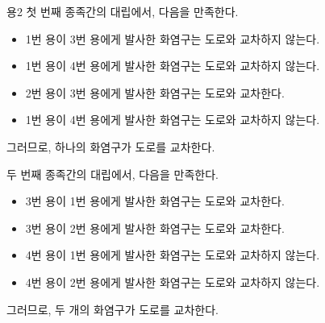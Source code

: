 \begin{problem}{용2}
	첫 번째 종족간의 대립에서, 다음을 만족한다.
	
	\begin{itemize}
		\item 1번 용이 3번 용에게 발사한 화염구는 도로와 교차하지 않는다.
		\item 1번 용이 4번 용에게 발사한 화염구는 도로와 교차하지 않는다.
		\item 2번 용이 3번 용에게 발사한 화염구는 도로와 교차한다.
		\item 1번 용이 4번 용에게 발사한 화염구는 도로와 교차하지 않는다.
	\end{itemize}

	그러므로, 하나의 화염구가 도로를 교차한다.
	
	두 번째 종족간의 대립에서, 다음을 만족한다.
	
	\begin{itemize}
		\item 3번 용이 1번 용에게 발사한 화염구는 도로와 교차한다.
		\item 3번 용이 2번 용에게 발사한 화염구는 도로와 교차한다.
		\item 4번 용이 1번 용에게 발사한 화염구는 도로와 교차하지 않는다.
		\item 4번 용이 2번 용에게 발사한 화염구는 도로와 교차하지 않는다.
	\end{itemize}

	그러므로, 두 개의 화염구가 도로를 교차한다.

	\begin{example}
	\end{example}
	
	
\end{problem}

